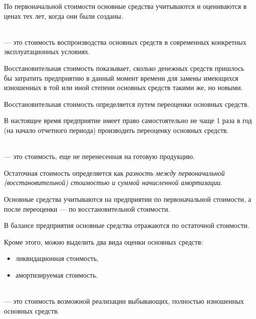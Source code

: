 По первоначальной стоимости основные средства учитываются и оцениваются в ценах
тех лет, когда они были созданы.


\begin{definition}
    \normalfont
    ~\\
     --- это стоимость воспроизводства
    основных средств в современных конкретных эксплуатационных условиях.
\end{definition}

Восстановительная стоимость показывает, сколько денежных средств пришлось бы
затратить предприятию в данный момент времени для замены имеющихся изношенных в
той или иной степени основных средств такими же, но новыми.

Восстановительная стоимость определяется путем переоценки основных средств.

В настоящее время предприятие имеет право самостоятельно не чаще 1 раза в год
(на начало отчетного периода) производить переоценку основных средств.


\begin{definition}
    \normalfont
    ~\\
     --- это стоимость, еще не перенесенная на
    готовую продукцию.
\end{definition}

Остаточная стоимость определяется как \textit{разность между первоначальной
(восстановительной) стоимостью и суммой начисленной амортизации}.

Основные средства учитываются на предприятии по первоначальной стоимости, а
после переоценки --- по восстановительной стоимости.

В балансе предприятия основные средства отражаются по остаточной стоимости.

Кроме этого, можно выделить два вида оценки основных средств:

\begin{itemize}
    \item ликвидационная стоимость,
    \item амортизируемая стоимость.
\end{itemize}

\begin{definition}
    \normalfont
    ~\\
     --- это стоимость возможной
    реализации выбывающих, полностью изношенных основных средств.
\end{definition}

